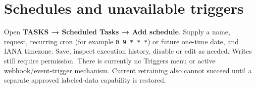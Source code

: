 \section*{Schedules and unavailable triggers}
Open \textbf{TASKS → Scheduled Tasks → Add schedule}. Supply a name, request, recurring cron (for example \texttt{0 9 * * *}) or future one-time date, and IANA timezone. Save, inspect execution history, disable or edit as needed. Writes still require permission. There is currently no Triggers menu or active webhook/event-trigger mechanism. Current retraining also cannot succeed until a separate approved labeled-data capability is restored.
